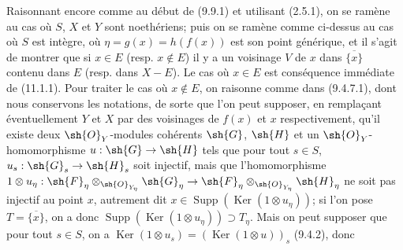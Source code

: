 Raisonnant encore comme au début de (9.9.1) et utilisant (2.5.1), on se ramène au cas où $S$, $X$ et $Y$ sont noethériens; puis on se ramène comme ci-dessus au cas où $S$ est intègre, où $\eta=g(x)=h(f(x))$ est son point générique, et il s'agit de montrer que si $x\in E$ (resp. $x\notin E$) il y a un voisinage $V$ de $x$ dans $\overline{\{x\}}$ contenu dans $E$ (resp. dans $X-E$). Le cas où $x\in E$ est conséquence immédiate de (11.1.1). Pour traiter le cas où $x\notin E$, on raisonne comme dans (9.4.7.1), dont nous conservons les notations, de sorte que l'on peut supposer, en remplaçant éventuellement $Y$ et $X$ par des voisinages de $f(x)$ et $x$ respectivement, qu'il existe deux $\sh{O}_Y$-modules cohérents $\sh{G}$, $\sh{H}$ et un $\sh{O}_Y$-homomorphisme $u:\sh{G}\to\sh{H}$ tels que pour tout $s\in S$, $u_s:\sh{G}_s\to\sh{H}_s$ soit injectif, mais que l'homomorphisme $1\otimes u_\eta:\sh{F}_\eta\otimes_{\sh{O}_{Y_\eta}}\sh{G}_\eta\to\sh{F}_\eta\otimes_{\sh{O}_{Y_\eta}}\sh{H}_\eta$ ne soit pas injectif au point $x$, autrement dit $x\in\operatorname{Supp}(\operatorname{Ker}(1\otimes u_\eta))$; si l'on pose $T=\overline{\{x\}}$, on a donc $\operatorname{Supp}(\operatorname{Ker}(1\otimes u_\eta))\supset T_\eta$. Mais on peut supposer que pour tout $s\in S$, on a $\operatorname{Ker}(1\otimes u_s)=(\operatorname{Ker}(1\otimes u))_s$ (9.4.2), donc

